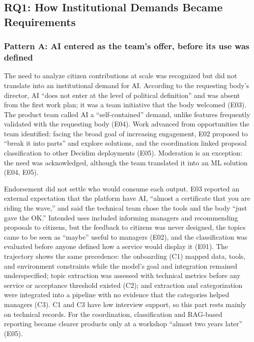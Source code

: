 \documentclass[sigconf,nonacm]{acmart}
\begin{document}
\subsection{RQ1: How Institutional Demands Became Requirements}
\label{sec:rq1}

\subsubsection{Pattern A: AI entered as the team's offer, before its use was defined}
\label{sec:pa}

The need to analyze citizen contributions at scale was recognized but did not translate into an institutional demand for AI. According to the requesting body's director, AI ``does not enter at the level of political definition'' and was absent from the first work plan; it was a team initiative that the body welcomed (E03). The product team called AI a ``self-contained'' demand, unlike features frequently validated with the requesting body (E04). Work advanced from opportunities the team identified: facing the broad goal of increasing engagement, E02 proposed to ``break it into parts'' and explore solutions, and the coordination linked proposal classification to other Decidim deployments (E05). Moderation is an exception: the need was acknowledged, although the team translated it into an ML solution (E04, E05).

Endorsement did not settle who would consume each output. E03 reported an external expectation that the platform have AI, ``almost a certificate that you are riding the wave,'' and said the technical team chose the tools and the body ``just gave the OK.'' Intended uses included informing managers and recommending proposals to citizens, but the feedback to citizens was never designed, the topics came to be seen as ``maybe'' useful to managers (E02), and the classification was evaluated before anyone defined how a service would display it (E01). The trajectory shows the same precedence: the onboarding (C1) mapped data, tools, and environment constraints while the model's goal and integration remained underspecified; topic extraction was assessed with technical metrics before any service or acceptance threshold existed (C2); and extraction and categorization were integrated into a pipeline with no evidence that the categories helped managers (C3). C1 and C3 have low interview support, so this part rests mainly on technical records. For the coordination, classification and RAG-based reporting became clearer products only at a workshop ``almost two years later'' (E05).
\end{document}
